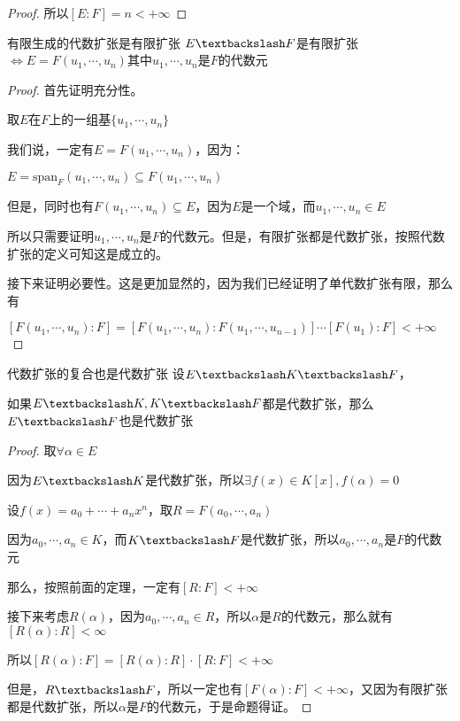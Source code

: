 \documentclass[12pt, a4paper, oneside, UTF8]{ctexbook}
\begin{document}
\begin{para}{0}
\begin{proof}
						所以$[E:F]=n < +\infty$
					\end{proof}
					\begin{them}{有限生成的代数扩张是有限扩张}{}
						$E \textbackslash F$是有限扩张$\Leftrightarrow E=F(u_1,\cdots,u_n)$其中$u_1,\cdots,u_n$是$F$的代数元
					\end{them}
					\begin{proof}
						首先证明充分性。
						
						取$E$在$F$上的一组基$\{u_1,\cdots,u_n\}$

						我们说，一定有$E=F(u_1,\cdots,u_n)$，因为：

						$E=\text{span}_F (u_1,\cdots,u_n) \subseteq F(u_1,\cdots,u_n)$

						但是，同时也有$F(u_1,\cdots,u_n) \subseteq E$，因为$E$是一个域，而$u_1,\cdots,u_n \in E$

						所以只需要证明$u_1,\cdots,u_n$是$F$的代数元。但是，有限扩张都是代数扩张，按照代数扩张的定义可知这是成立的。

						接下来证明必要性。这是更加显然的，因为我们已经证明了单代数扩张有限，那么有

						$[F(u_1,\cdots,u_n):F]=[F(u_1,\cdots,u_{n}):F(u_1,\cdots,u_{n-1})]\cdots [F(u_1):F] < +\infty$
					\end{proof}
					\begin{them}{代数扩张的复合也是代数扩张}{}
						设$E\textbackslash K\textbackslash F$，

						如果$E\textbackslash K,K\textbackslash F$都是代数扩张，那么$E\textbackslash F$也是代数扩张
					\end{them}
					\begin{proof}
						取$\forall \alpha \in E$
						
						因为$E\textbackslash K$是代数扩张，所以$\exists f(x) \in K[x],f(\alpha)=0$

						设$f(x)=a_0 + \cdots + a_n x^n$，取$R=F(a_0,\cdots,a_n)$

						因为$a_0,\cdots,a_n \in K$，而$K \textbackslash F$是代数扩张，所以$a_0,\cdots,a_n$是$F$的代数元

						那么，按照前面的定理，一定有$[R:F] < +\infty$

						接下来考虑$R(\alpha)$，因为$a_0,\cdots,a_n \in R$，所以$\alpha$是$R$的代数元，那么就有$[R(\alpha):R]< \infty$

						所以$[R(\alpha):F]=[R(\alpha):R]\cdot [R:F]<+\infty$

						但是，$R \textbackslash F$，所以一定也有$[F(\alpha):F] < +\infty$，又因为有限扩张都是代数扩张，所以$\alpha$是$F$的代数元，于是命题得证。
					\end{proof}
			\end{para}
\end{document}
